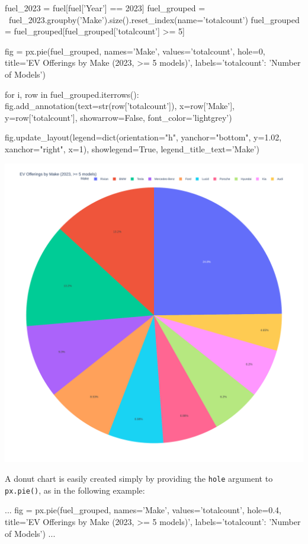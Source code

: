 \begin{samepage}
\begin{pythoncode}
fuel_2023 = fuel[fuel['Year'] == 2023]
fuel_grouped = \
    fuel_2023.groupby('Make').size().reset_index(name='totalcount')
fuel_grouped = fuel_grouped[fuel_grouped['totalcount'] >= 5]

fig = px.pie(fuel_grouped, 
    names='Make', values='totalcount', hole=0,
    title='EV Offerings by Make (2023, >= 5 models)',
    labels={'totalcount': 'Number of Models'})

for i, row in fuel_grouped.iterrows():
    fig.add_annotation(text=str(row['totalcount']),
            x=row['Make'], y=row['totalcount'], 
            showarrow=False, font_color='lightgrey')

fig.update_layout(legend=dict(orientation="h", yanchor="bottom", 
    y=1.02, xanchor="right", x=1),
    showlegend=True, legend_title_text='Make')
\end{pythoncode}
\end{samepage}

\begin{center}
  \includegraphics[width=.6\textwidth]{px.fuel.pie.pdf}
\end{center}

A donut chart is easily created simply by providing the \texttt{hole} argument to \texttt{px.pie()}, as in the following example:

\begin{samepage}
\begin{pythoncode}
...
fig = px.pie(fuel_grouped, 
    names='Make', values='totalcount', hole=0.4,
    title='EV Offerings by Make (2023, >= 5 models)',
    labels={'totalcount': 'Number of Models'})
...
\end{pythoncode}
\end{samepage}

